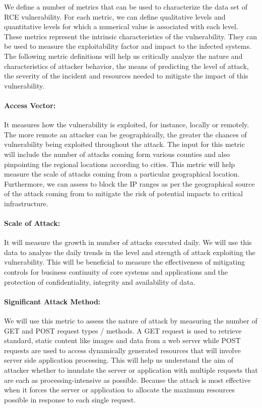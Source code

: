 We define a number of metrics that can be used to characterize the data set of RCE vulnerability. For each metric, we can define qualitative levels and quantitative levels for which a numerical value is associated with each level. These metrics represent the intrinsic characteristics of the vulnerability. They can be used to measure the exploitability factor and impact to the infected systems. The following metric definitions will help us critically analyze the nature and characteristics of attacker behavior, the means of predicting the level of attack, the severity of the incident and resources needed to mitigate the impact of this vulnerability.    
\indent
\paragraph{Access Vector:}
It measures how the vulnerability is exploited, for instance, locally or remotely. The more remote an attacker can be geographically, the greater the chances of vulnerability being exploited throughout the attack.  The input for this metric will include the number of attacks coming form various counties and also pinpointing the regional locations according to cities. This metric will help measure the scale of attacks coming from a particular geographical location. Furthermore, we can assess to block the IP ranges as per the geographical source of the attack coming from to mitigate the risk of potential impacts to critical infrastructure. 
\indent
\paragraph{Scale of Attack:}
It will measure the growth in number of attacks executed daily. We will use this data to analyze the daily trends in the level and strength of attack exploiting the vulnerability. This will be beneficial to measure the effectiveness of mitigating controls for business continuity of core systems and applications and the protection of confidentiality, integrity and availability of data.
\indent
\paragraph{Significant Attack Method:}
We will use this metric to assess the nature of attack by measuring the number of GET and POST request types / methods. A GET request is used to retrieve standard, static content like images and data from a web server while POST requests are used to access dynamically generated resources that will involve server side application processing. This will help us understand the aim of attacker whether to inundate the server or application with multiple requests that are each as processing-intensive as possible. Because the attack is most effective when it forces the server or application to allocate the maximum resources possible in response to each single request.
\indent
